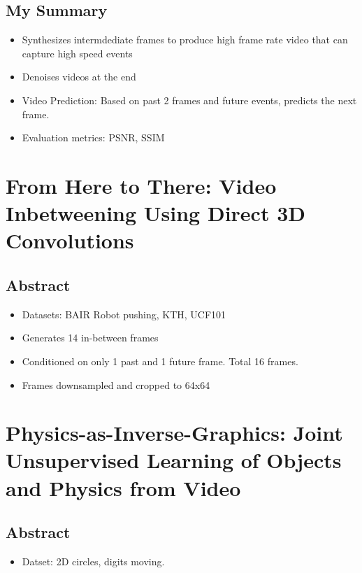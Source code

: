 \documentclass{article}
\begin{document}
    \subsection{My Summary}\label{subsec:Event_driven_Video_Frame_Synthesis:my-summary}
    \begin{itemize}
        \item Synthesizes intermdediate frames to produce high frame rate video that can capture high speed events
        \item Denoises videos at the end
        \item Video Prediction: Based on past 2 frames and future events, predicts the next frame.
        \item Evaluation metrics: PSNR, SSIM
    \end{itemize}

    \newpage


    \section{From Here to There: Video Inbetweening Using Direct 3D Convolutions}\label{sec:From_Here_to_There_Video_Inbetweening_Using_Direct_3D_Convolutions}
    \subsection*{Abstract}
    \begin{itemize}
        \item Datasets: BAIR Robot pushing, KTH, UCF101
        \item Generates 14 in-between frames
        \item Conditioned on only 1 past and 1 future frame.
        Total 16 frames.
        \item Frames downsampled and cropped to 64x64
    \end{itemize}
    \newpage


    \section{Physics-as-Inverse-Graphics: Joint Unsupervised Learning of Objects and Physics from Video}\label{sec:Physics_as_Inverse_Graphics_Joint_Unsupervised_Learning_of_Objects_and_Physics_from_Video}
    \subsection*{Abstract}
    \begin{itemize}
        \item Datset: 2D circles, digits moving.
    \end{itemize}
    \newpage
\end{document}
